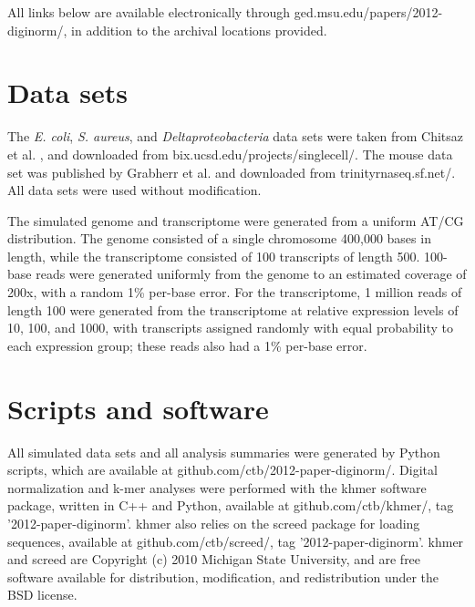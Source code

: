 \documentclass{pnastwo}
\begin{document}
\begin{article}

\begin{materials}

All links below are available electronically through
ged.msu.edu/papers/2012-diginorm/, in addition to the
archival locations provided.

\section{Data sets}

The {\em E. coli}, {\em S. aureus}, and {\em Deltaproteobacteria} data
sets were taken from Chitsaz et al. \cite{pubmed21926975}, and
downloaded from bix.ucsd.edu/projects/singlecell/.  The
mouse data set was published by Grabherr et al. \cite{pubmed21572440}
and downloaded from trinityrnaseq.sf.net/.  All data sets
were used without modification.

The simulated genome and transcriptome were generated from a uniform
AT/CG distribution.  The genome consisted of a single chromosome
400,000 bases in length, while the transcriptome consisted of 100
transcripts of length 500.  100-base reads were generated uniformly
from the genome to an estimated coverage of 200x, with a random 1\%
per-base error.  For the transcriptome, 1 million reads of length 100
were generated from the transcriptome at relative expression levels of
10, 100, and 1000, with transcripts assigned randomly with equal
probability to each expression group; these reads also had a 1\%
per-base error.

\section{Scripts and software}

All simulated data sets and all analysis summaries were generated by
Python scripts, which are available at
github.com/ctb/2012-paper-diginorm/.  Digital normalization and k-mer
analyses were performed with the khmer software package, written in
C++ and Python, available at github.com/ctb/khmer/, tag
'2012-paper-diginorm'.  khmer also relies on the screed package for
loading sequences, available at github.com/ctb/screed/, tag
'2012-paper-diginorm'.  khmer and screed are Copyright (c) 2010
Michigan State University, and are free software available for
distribution, modification, and redistribution under the BSD license.


\end{materials}
\end{article}
\end{document}
